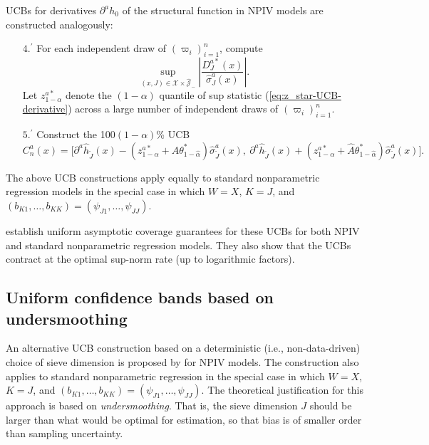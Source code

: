 \documentclass[
]{jss}
\begin{document}
UCBs for derivatives \(\partial^a h_0\) of the structural function in
NPIV models are constructed analogously:

\begin{enumerate}
\item[$4.^{\prime}$] For each independent draw of $(\varpi_i)_{i=1}^n$, compute
\begin{equation} \label{eq:z_star-UCB-derivative}
 \sup_{(x,J) \in \mathcal{X} \times \hat{\mathcal J}_{-}} \left| \frac{D_J^{a*}(x)}{\hat \sigma_J^a(x)} \right|.
\end{equation}
Let $z_{1-\alpha}^{a*}$ denote the $(1-\alpha )$ quantile of sup statistic (\ref{eq:z_star-UCB-derivative}) across a large number of independent draws of $(\varpi_i)_{i=1}^n$.
\item[$5.^{\prime}$] Construct the 100$(1-\alpha)$\% UCB
\begin{equation} \label{band-derivative}
 C_n^a(x) = \bigg[ \partial^a \hat{h}_{\tilde{J}}(x) - \left(\! z_{1-\alpha}^{a*} + \hat A \theta^*_{1-\hat \alpha} \! \right) \hat \sigma_{\tilde J}^a(x) ,~ \partial^a \hat{h}_{\tilde{J}}(x) + \left( \!z_{1-\alpha}^{a*} + \hat A \theta^*_{1-\hat \alpha} \! \right ) \hat \sigma_{\tilde J}^a(x) \bigg] .
\end{equation}
\end{enumerate}

The above UCB constructions apply equally to standard nonparametric
regression models in the special case in which \(W = X\), \(K = J\), and
\((b_{K1},\ldots,b_{KK}) = (\psi_{J1},\ldots,\psi_{JJ})\).

\citet{CCK} establish uniform asymptotic coverage guarantees for these
UCBs for both NPIV and standard nonparametric regression models. They
also show that the UCBs contract at the optimal sup-norm rate (up to
logarithmic factors).

\hypertarget{uniform-confidence-bands-based-on-undersmoothing}{%
\subsection{Uniform confidence bands based on
undersmoothing}\label{uniform-confidence-bands-based-on-undersmoothing}}

An alternative UCB construction based on a deterministic (i.e.,
non-data-driven) choice of sieve dimension is proposed by \citet{CCQE}
for NPIV models. The construction also applies to standard nonparametric
regression in the special case in which \(W = X\), \(K = J\), and
\((b_{K1},\ldots,b_{KK}) = (\psi_{J1},\ldots,\psi_{JJ})\). The
theoretical justification for this approach is based on
\emph{undersmoothing}. That is, the sieve dimension \(J\) should be
larger than what would be optimal for estimation, so that bias is of
smaller order than sampling uncertainty.
\end{document}
